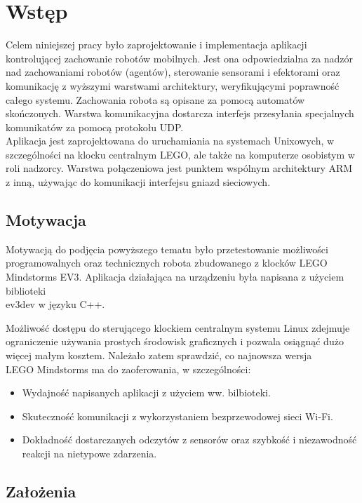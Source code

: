 \chapter{Wstęp}
\label{ch:wstep}

Celem niniejszej pracy było zaprojektowanie i implementacja aplikacji kontrolującej zachowanie robotów mobilnych. Jest ona odpowiedzialna za nadzór nad zachowaniami robotów (agentów), sterowanie sensorami i efektorami oraz komunikację z wyższymi warstwami architektury, weryfikującymi poprawność całego systemu. Zachowania robota są opisane za pomocą automatów skończonych. Warstwa komunikacyjna dostarcza interfejs przesyłania specjalnych komunikatów za pomocą protokołu UDP.\\

Aplikacja jest zaprojektowana do uruchamiania na systemach Unixowych, w szczególności na klocku centralnym LEGO, ale także na komputerze osobistym w roli nadzorcy. Warstwa połączeniowa jest punktem wspólnym architektury ARM z inną, używając do komunikacji interfejsu gniazd sieciowych.
\clearpage

\section{Motywacja}

Motywacją do podjęcia powyższego tematu było przetestowanie możliwości programowalnych oraz technicznych robota zbudowanego z klocków LEGO Mindstorms EV3. Aplikacja działająca na urządzeniu była napisana z użyciem biblioteki\\
ev3dev \cite{ev3dev} w języku C++.

Możliwość dostępu do sterującego klockiem centralnym systemu Linux zdejmuje ograniczenie używania prostych środowisk graficznych i pozwala osiągnąć dużo więcej małym kosztem. Należało zatem sprawdzić, co najnowsza wersja \\LEGO Mindstorms ma do zaoferowania, w szczególności:
\begin{itemize}
    \item Wydajność napisanych aplikacji z użyciem ww. bilbioteki.
    \item Skuteczność komunikacji z wykorzystaniem bezprzewodowej sieci Wi-Fi.
    \item Dokładność dostarczanych odczytów z sensorów oraz szybkość i niezawodność reakcji na nietypowe zdarzenia.
\end{itemize}

\section{Założenia}

